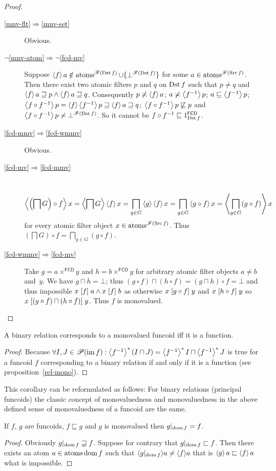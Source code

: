 \begin{proof}
\begin{description}
\item [{\ref{mnv-flt}$\Rightarrow$\ref{mnv-set}}] Obvious.
\item [{$\lnot$\ref{mnv-atom}$\Rightarrow$$\lnot$\ref{fcd-mv}}] Suppose
$\left\langle f\right\rangle a\notin\operatorname{atoms}^{\mathscr{F}(\operatorname{Dst} f)}\cup\{\bot^{\mathscr{F}(\operatorname{Dst} f)}\}$
for some $a\in\operatorname{atoms}^{\mathscr{F}(\operatorname{Src} f)}$. Then there exist two
atomic filters $p$ and $q$ on $\operatorname{Dst} f$ such that $p\ne q$ and
$\left\langle f\right\rangle a\sqsupseteq p\land\left\langle f\right\rangle a\sqsupseteq q$. Consequently
$p\not\asymp\left\langle f\right\rangle a$; $a\not\asymp\left\langle f^{-1}\right\rangle p$;
$a\sqsubseteq\left\langle f^{-1}\right\rangle p$;
$\left\langle f\circ f^{-1}\right\rangle p=\left\langle f\right\rangle\left\langle f^{-1}\right\rangle p\sqsupseteq\left\langle f\right\rangle a\sqsupseteq q$;
$\left\langle f\circ f^{-1}\right\rangle p\not\sqsubseteq p$ and $\left\langle f\circ
f^{-1}\right\rangle p\ne\bot^{\mathscr{F}(\operatorname{Dst} f)}$.
So it cannot be $f\circ f^{-1}\sqsubseteq1_{\operatorname{Dst} f}^{\mathsf{FCD}}$.
\item [{\ref{fcd-mmv}$\Rightarrow$\ref{fcd-wmmv}}] Obvious.
\item [{\ref{fcd-mv}$\Rightarrow$\ref{fcd-mmv}}] ~
\[
\left\langle \left(\bigsqcap G\right)\circ f\right\rangle x=\left\langle \bigsqcap
G\right\rangle\left\langle f\right\rangle x=\bigsqcap_{g\in G}\left\langle g\right\rangle\left\langle f\right\rangle x=\bigsqcap_{g\in
G}\left\langle g\circ f\right\rangle x=\left\langle \bigsqcap_{g\in G}(g\circ f)\right\rangle x
\]
for every atomic filter object $x\in\operatorname{atoms}^{\mathscr{F}(\operatorname{Src} f)}$.
Thus $\left(\bigsqcap G\right)\circ f=\bigsqcap_{g\in G}(g\circ f)$.
\item [{\ref{fcd-wmmv}$\Rightarrow$\ref{fcd-mv}}] Take
$g=a\times^{\mathsf{FCD}}y$
and $h=b\times^{\mathsf{FCD}}y$ for arbitrary atomic filter objects
$a\ne b$ and~$y$. We have $g\sqcap h=\bot$; thus $(g\circ f)\sqcap(h\circ
f)=(g\sqcap h)\circ f=\bot$
and thus impossible $x\mathrel{\left[f\right]}a\land x\mathrel{\left[f\right]}b$ as otherwise $x\mathrel{\left[g\circ
f\right]}y$
and $x\mathrel{\left[h\circ f\right]}y$ so $x\mathrel{\left[(g\circ f)\sqcap(h\circ f)\right]}y$.
Thus $f$ is monovalued.
\end{description}
\end{proof}
\begin{cor}
A binary relation corresponds to a monovalued funcoid iff it is a
function.\end{cor}
\begin{proof}
Because $\forall I,J\in\mathscr{P}(\operatorname{im} f):\left\langle f^{-1}\right\rangle ^{\ast}(I\sqcap
J)=\left\langle f^{-1}\right\rangle ^{\ast}I\sqcap\left\langle f^{-1}\right\rangle ^{\ast}J$
is true for a funcoid $f$ corresponding to a binary relation if and
only if it is a function (see proposition~\ref{rel-mono}).\end{proof}
\begin{rem}
This corollary can be reformulated as follows: For binary relations
(principal funcoids) the classic concept of monovaluedness and monovaluedness
in the above defined sense of monovaluedness of a funcoid are the
same.\end{rem}
\begin{thm}
If $f$, $g$ are funcoids, $f\sqsubseteq g$ and $g$ is monovalued
then $g|_{\operatorname{dom} f}=f$.\end{thm}
\begin{proof}
Obviously $g|_{\operatorname{dom} f}\sqsupseteq f$. Suppose for contrary that $g|_{\operatorname{dom}
f}\sqsubset f$.
Then there exists an atom $a\in\operatorname{atoms}\operatorname{dom} f$ such that $\langle g|_{\operatorname{dom}
f}\rangle a\neq\langle f\rangle a$
that is $\left\langle g\right\rangle a\sqsubset\left\langle f\right\rangle a$ what is impossible.
\end{proof}

